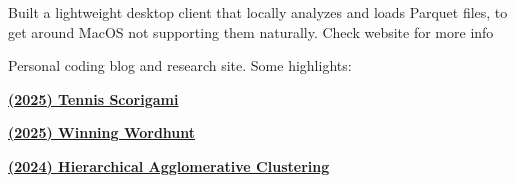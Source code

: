 \documentclass[]{deedy-resume}
\begin{document}
\begin{minipage}[t]{0.66\textwidth}
\begin{tightitemize}
    \item Built a lightweight desktop client that locally analyzes and loads Parquet files, to get around MacOS not supporting them naturally. Check website for more info
\end{tightitemize}
\sectionspace

\begin{tightitemize}
    \item Personal coding blog and research site. Some highlights:
    \vspace{4pt}
    \begin{tightitemize}
        \item \textbf{\href{https://johnlarkin1.github.io/2025/tennis-scorigami/}{(2025) Tennis Scorigami}}
        \item \textbf{\href{https://johnlarkin1.github.io/2025/wordhunt-solver/}{(2025) Winning Wordhunt}}
        \item \textbf{\href{https://johnlarkin1.github.io/2024/into-the-arena/}{(2024) Hierarchical Agglomerative Clustering}}
    \end{tightitemize}
\end{tightitemize}
\sectionspace


\end{minipage}
\end{document}
